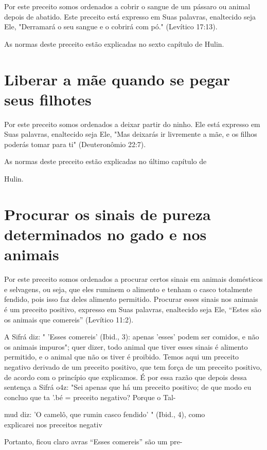 Por este preceito somos ordenados a cobrir o sangue de um pássaro ou
animal depois de abatido. Este preceito está expresso em Suas palavras,
enal­tecido seja Ele, "Derramará o seu sangue e o cobrirá com pó."
(Levítico 17:13).




As normas deste preceito estão explicadas no sexto capítulo de Hulin.


\section{Liberar a mãe quando se pegar seus filhotes}

Por este preceito somos ordenados a deixar partir do ninho. Ele está
expresso em Suas palavras, enaltecido seja Ele, "Mas deixarás ir
livremente a mãe, e os filhos poderás tomar para ti" (Deuteronômio
22:7).


As normas deste preceito estão explicadas no último capítulo de


Hulin.

\section{Procurar os sinais de pureza determinados no gado e nos animais}

Por este preceito somos ordenados a procurar certos sinais em ani­mais
domésticos e selvagens, ou seja, que eles ruminem o alimento e tenham o
casco totalmente fendido, pois isso faz deles alimento permitido.
Procurar esses sinais nos animais é um preceito positivo, expresso em
Suas palavras, enal­tecido seja Ele, ``Estes são os animais que comereis''
(Levítico 11:2).

A Sifrá diz: " 'Esses comereis' (Ibid., 3): apenas 'esses' podem ser
co­midos, e não os animais impuros"; quer dizer, todo animal que tiver
esses si­nais é alimento permitido, e o animal que não os tiver é
proibido. Temos aqui um preceito negativo derivado de um preceito
positivo, que tem força de um preceito positivo, de acordo com o
princípio que explicamos. É por essa razão que depois dessa sentença a
Sifrá o4z: "Sei apenas que há um preceito positivo; de que modo eu
concluo que ta '.bé = preceito negativo? Porque o Tal-

mud diz: 'O camelô, que rumin casco fendido' " (Ibid., 4), como\\
explicarei nos preceitos negativ

Portanto, ficou claro avras ``Esses comereis'' são um pre-

